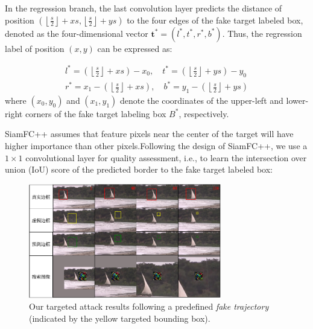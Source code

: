 \documentclass[journal]{IEEEtran}
\begin{document}
In the regression branch, the last convolution layer predicts the distance of position $\left(\left\lfloor\frac{s}{2}\right\rfloor+x s,\left\lfloor\frac{s}{2}\right\rfloor+y s\right)$ to the four edges of the fake target labeled box, denoted as the four-dimensional vector $\boldsymbol{t}^{*}=\left(l^{*}, t^{*}, r^{*}, b^{*}\right)$. Thus, the regression label of position $(x,y)$ can be expressed as:

\begin{equation}
  \begin{array}{ll}
  l^{*}=\left(\left\lfloor\frac{s}{2}\right\rfloor+x s\right)-x_{0}, \quad t^{*}=\left(\left\lfloor\frac{s}{2}\right\rfloor+y s\right)-y_{0} \\
  r^{*}=x_{1}-\left(\left\lfloor\frac{s}{2}\right\rfloor+x s\right), \quad b^{*}=y_{1}-\left(\left\lfloor\frac{s}{2}\right\rfloor+y s\right)
  \end{array}
\end{equation}
where $(x_0, y_0)$ and $(x_1, y_1)$ denote the coordinates of the upper-left and lower-right corners of the fake target labeling box $B^*$, respectively.

SiamFC++ assumes that feature pixels near the center of the target will have higher importance than other pixels.Following the design of SiamFC++, we use a $1 \times 1$ convolutional layer for quality assessment, i.e., to learn the intersection over union (IoU) score of the predicted border to the fake target labeled box:

\begin{figure}[t]
  \centering
  \includegraphics[width=0.75\textwidth]{images/vis_v5.pdf}
  \caption{Our targeted attack results following a predefined \textit{fake trajectory} (indicated by the yellow targeted bounding box).}
  \label{fig:vis}
\end{figure}
\end{document}
